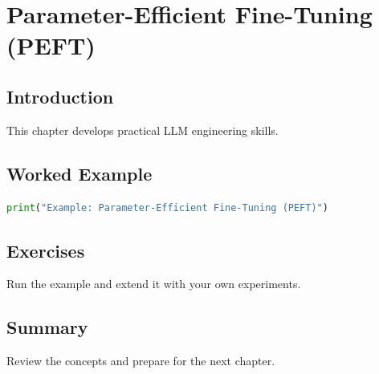 \chapter{Parameter-Efficient Fine-Tuning (PEFT)}
\label{chap:vol9-10}



\section{Introduction}
This chapter develops practical LLM engineering skills.

\section{Worked Example}
\begin{lstlisting}[language=Python]
print("Example: Parameter-Efficient Fine-Tuning (PEFT)")
\end{lstlisting}

\section{Exercises}
\begin{exercise}
Run the example and extend it with your own experiments.
\end{exercise}

\section{Summary}
Review the concepts and prepare for the next chapter.
